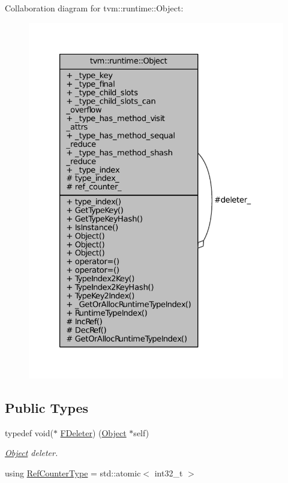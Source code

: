 Collaboration diagram for tvm\+:\+:runtime\+:\+:Object\+:
\nopagebreak
\begin{figure}[H]
\begin{center}
\leavevmode
\includegraphics[width=326pt]{classtvm_1_1runtime_1_1Object__coll__graph}
\end{center}
\end{figure}
\subsection*{Public Types}
\begin{DoxyCompactItemize}
\item 
typedef void($\ast$ \hyperlink{classtvm_1_1runtime_1_1Object_a9e84841ca982bff376a978ade0132631}{F\+Deleter}) (\hyperlink{classtvm_1_1runtime_1_1Object}{Object} $\ast$self)
\begin{DoxyCompactList}\small\item\em \hyperlink{classtvm_1_1runtime_1_1Object}{Object} deleter. \end{DoxyCompactList}\item 
using \hyperlink{classtvm_1_1runtime_1_1Object_a55549a6c23987890246248682560a03d}{Ref\+Counter\+Type} = std\+::atomic$<$ int32\+\_\+t $>$
\end{DoxyCompactItemize}
